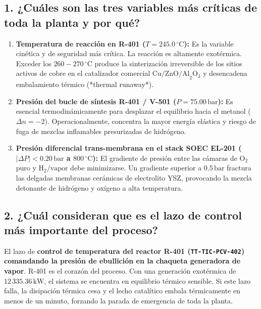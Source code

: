 \documentclass[10pt,letterpaper]{article}
\begin{document}
\subsection*{1. ¿Cuáles son las tres variables más críticas de toda la planta y por qué?}
\begin{enumerate}
    \item \textbf{Temperatura de reacción en R-401 ($T = 245.0\,^\circ\text{C}$):} Es la variable cinética y de seguridad más crítica. La reacción es altamente exotérmica. Exceder los $260-270\,^\circ\text{C}$ produce la sinterización irreversible de los sitios activos de cobre en el catalizador comercial $\text{Cu/ZnO/Al}_2\text{O}_3$ y desencadena embalamiento térmico (*thermal runaway*).
    \item \textbf{Presión del bucle de síntesis R-401 / V-501 ($P = 75.00\,\text{bar}$):} Es esencial termodinámicamente para desplazar el equilibrio hacia el metanol ($\Delta n = -2$). Operacionalmente, concentra la mayor energía elástica y riesgo de fuga de mezclas inflamables presurizadas de hidrógeno.
    \item \textbf{Presión diferencial trans-membrana en el stack SOEC EL-201 ($|\Delta P| < 0.20\,\text{bar}$ a $800\,^\circ\text{C}$):} El gradiente de presión entre las cámaras de $\text{O}_2$ puro y $\text{H}_2/\text{vapor}$ debe minimizarse. Un gradiente superior a $0.5\,\text{bar}$ fractura las delgadas membranas cerámicas de electrolito YSZ, provocando la mezcla detonante de hidrógeno y oxígeno a alta temperatura.
\end{enumerate}

\subsection*{2. ¿Cuál consideran que es el lazo de control más importante del proceso?}
El lazo de \textbf{control de temperatura del reactor R-401 (\texttt{TT-TIC-PCV-402}) comandando la presión de ebullición en la chaqueta generadora de vapor}. R-401 es el corazón del proceso. Con una generación exotérmica de $12\,335.36\,\text{kW}$, el sistema se encuentra en equilibrio térmico sensible. Si este lazo falla, la disipación térmica cesa y el lecho catalítico embala térmicamente en menos de un minuto, forzando la parada de emergencia de toda la planta.
\end{document}
